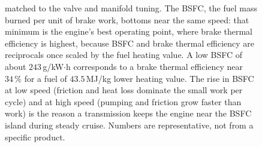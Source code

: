 \begin{figure}[htbp]
{matched to the valve and manifold tuning. The BSFC, the fuel mass burned per
unit of brake work, bottoms near the same speed: that minimum is the engine's
best operating point, where brake thermal efficiency is highest, because BSFC
and brake thermal efficiency are reciprocals once scaled by the fuel heating
value. A low BSFC of about $243\,$g/kW$\cdot$h corresponds to a brake thermal
efficiency near $34\,\%$ for a fuel of $43.5\,$MJ/kg lower heating value. The
rise in BSFC at low speed (friction and heat loss dominate the small work per
cycle) and at high speed (pumping and friction grow faster than work) is the
reason a transmission keeps the engine near the BSFC island during steady
cruise. Numbers are representative, not from a specific product.}
\label{fig:vol04ch03:engine-power-bsfc}
\end{figure}
